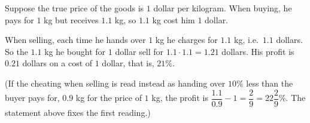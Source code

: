Suppose the true price of the goods is $1$ dollar per kilogram. When buying, he pays for $1$ kg but receives $1.1$ kg, so $1.1$ kg cost him $1$ dollar.

When selling, each time he hands over $1$ kg he charges for $1.1$ kg, i.e.\ $1.1$ dollars. So the $1.1$ kg he bought for $1$ dollar sell for $1.1\cdot1.1=1.21$ dollars. His profit is $0.21$ dollars on a cost of $1$ dollar, that is, $\boxed{21\%}$.

(If the cheating when selling is read instead as handing over $10\%$ less than the buyer pays for, $0.9$ kg for the price of $1$ kg, the profit is $\dfrac{1.1}{0.9}-1=\dfrac{2}{9}=22\dfrac{2}{9}\%$. The statement above fixes the first reading.)
